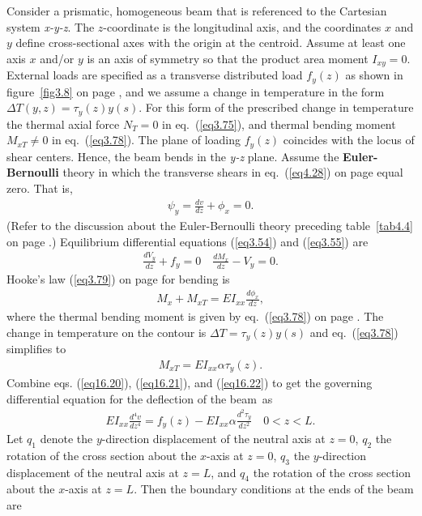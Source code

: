 \documentclass{AeroStructure-ERJohnson}
\begin{document}
Consider a prismatic, homogeneous beam that is referenced to the Cartesian system \textit{x-y-z}. The $z$-coordinate is the longitudinal axis, and the coordinates $x$ and $y$ define cross-sectional axes with the origin at the centroid. Assume at least one axis $x$ and/or $y$ is an axis of symmetry so that the product area moment $I_{x y}=0$. External loads are specified as a transverse distributed load $f_{y}(z)$ as shown in figure~\ref{fig3.8} on page \pageref{fig3.8}, and we assume a change in temperature in the form $\Delta T(y, z)=\tau_{y}(z) y(s)$. For this form of the prescribed change in temperature the thermal axial force $N_{T}=0$ in eq.~(\ref{eq3.75}), and thermal bending moment $M_{x T} \neq 0$ in eq.~(\ref{eq3.78}). The plane of loading $f_{y}(z)$ coincides with the locus of shear centers. Hence, the beam bends in the \textit{y-z} plane. Assume the \textbf{Euler-Bernoulli} theory in which the transverse shears in eq.~(\ref{eq4.28}) on page \pageref{eq4.28} equal zero. That is,
\begin{align}\label{eq16.19}
\psi_{y}=\frac{d v}{d z}+\phi_{x}=0.
\end{align}
(Refer to the discussion about the Euler-Bernoulli theory preceding table~\ref{tab4.4} on page \pageref{tab4.4}.) Equilibrium differential equations (\ref{eq3.54}) and (\ref{eq3.55}) are
\begin{align}\label{eq16.20}
\frac{d V_{y}}{d z}+f_{y}=0 \quad \frac{d M_{x}}{d z}-V_{y}=0.
\end{align}
Hooke's law (\ref{eq3.79}) on page \pageref{eq3.79} for bending is
\begin{align}\label{eq16.21}
M_{x}+M_{x T}=E I_{x x} \frac{d \phi_{x}}{d z},
\end{align}
where the thermal bending moment is given by eq.~(\ref{eq3.78}) on page \pageref{eq3.78}. The change in temperature on the contour is $\Delta T=\tau_{y}(z) y(s)$ and eq.~(\ref{eq3.78}) simplifies to
\begin{align}\label{eq16.22}
M_{x T}=E I_{x x} \alpha \tau_{y}(z).
\end{align}
Combine eqs. (\ref{eq16.20}), (\ref{eq16.21}), and (\ref{eq16.22}) to get the governing differential equation for the deflection of the beam~as
\begin{align}\label{eq16.23}
E I_{x x} \frac{d^{4} v}{d z^{4}}=f_{y}(z)-E I_{x x} \alpha \frac{d^{2} \tau_{y}}{d z^{2}} \quad 0<z<L.
\end{align}
Let $q_{1}$ denote the $y$-direction displacement of the neutral axis at $z = 0$, $q_{2}$ the rotation of the cross section about the $x$-axis at $z = 0$, $q_{3}$ the $y$-direction displacement of the neutral axis at $z = \textit{L}$, and $q_{4}$ the rotation of the cross section about the $x$-axis at $z = \textit{L}$. Then the boundary conditions at the ends of the beam are
\end{document}
